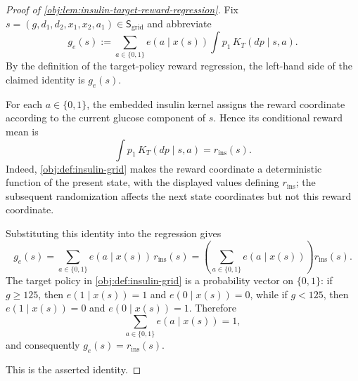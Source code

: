 \documentclass[11pt]{article}
\begin{document}
\begin{proof}[Proof of \cref{obj:lem:insulin-target-reward-regression}]
Fix \(s=(g,d_1,d_2,x_1,x_2,a_1)\in\mathsf S_{\mathrm{grid}}\) and abbreviate
\[
g_e(s)
:=
\sum_{a\in\{0,1\}} e(a\mid x(s))\int p_1\,K_T(dp\mid s,a).
\]
By the definition of the target-policy reward regression, the left-hand side of the claimed identity is \(g_e(s)\). %

For each \(a\in\{0,1\}\), the embedded insulin kernel assigns the reward coordinate according to the current glucose component of \(s\). Hence its conditional reward mean is
\[
\int p_1\,K_T(dp\mid s,a)
=
r_{\mathrm{ins}}(s).
\]
Indeed, \cref{obj:def:insulin-grid} makes the reward coordinate a deterministic function of the present state, with the displayed values defining \(r_{\mathrm{ins}}\); the subsequent randomization affects the next state coordinates but not this reward coordinate. %

Substituting this identity into the regression gives
\[
g_e(s)
=
\sum_{a\in\{0,1\}} e(a\mid x(s))\,r_{\mathrm{ins}}(s)
=
\left(\sum_{a\in\{0,1\}} e(a\mid x(s))\right) r_{\mathrm{ins}}(s).
\]
The target policy in \cref{obj:def:insulin-grid} is a probability vector on \(\{0,1\}\): if \(g\ge 125\), then \(e(1\mid x(s))=1\) and \(e(0\mid x(s))=0\), while if \(g<125\), then \(e(1\mid x(s))=0\) and \(e(0\mid x(s))=1\). Therefore
\[
\sum_{a\in\{0,1\}} e(a\mid x(s))=1,
\]
and consequently \(g_e(s)=r_{\mathrm{ins}}(s)\). %

This is the asserted identity. %
\end{proof}
\end{document}

